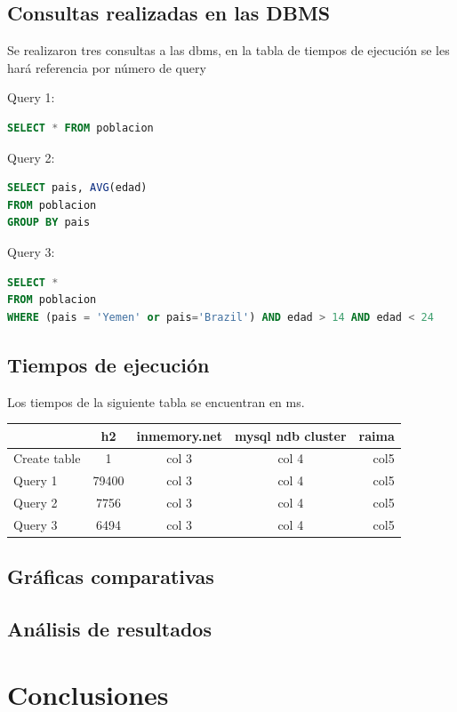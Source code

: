 \documentclass{acmart}
\begin{document}
    \subsection{Consultas realizadas en las DBMS}

Se realizaron tres consultas a las dbms, en la tabla de tiempos de ejecución se les hará referencia por número de query

Query 1:
\begin{lstlisting}[language=sql]
SELECT * FROM poblacion
\end{lstlisting}

Query 2:
\begin{lstlisting}[language=sql]
SELECT pais, AVG(edad)
FROM poblacion
GROUP BY pais
\end{lstlisting}

Query 3:
\begin{lstlisting}[language=sql]
SELECT *
FROM poblacion
WHERE (pais = 'Yemen' or pais='Brazil') AND edad > 14 AND edad < 24

\end{lstlisting}

\subsection{Tiempos de ejecución}
Los tiempos de la siguiente tabla se encuentran en ms.

\begin{tabular}{||l | c | c| c|r||} 
\hline 
\hline & h2 & inmemory.net & mysql ndb cluster & raima\\ 
\hline Create table & 1 & col 3 & col 4 & col5\\ 
\hline Query 1 & 79400 & col 3 & col 4 & col5\\ 
\hline Query 2 & 7756 & col 3 & col 4 & col5\\ 
\hline Query 3 & 6494 & col 3 & col 4 & col5\\ 
\hline 
\end{tabular}

\subsection{Gráficas comparativas}

\subsection{Análisis de resultados}

\section{Conclusiones}
\end{document}
